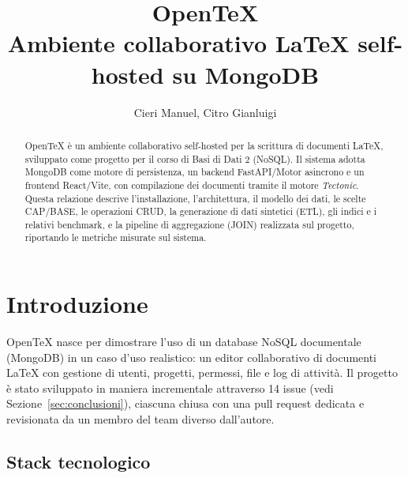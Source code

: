 \documentclass[11pt,a4paper]{article}
\title{\textbf{OpenTeX}\\[0.3em]\large Ambiente collaborativo LaTeX self-hosted su MongoDB\\[0.3em]}
\author{
  Cieri Manuel, Citro Gianluigi
}
\date{
}
\begin{document}
\maketitle
\vspace{-2.5em}
\begin{abstract}
\vspace{-0.5em}
\noindent
OpenTeX è un ambiente collaborativo self-hosted per la scrittura di documenti LaTeX, sviluppato come progetto per il corso di Basi di Dati 2 (NoSQL). Il sistema adotta MongoDB come motore di persistenza, un backend FastAPI/Motor asincrono e un frontend React/Vite, con compilazione dei documenti tramite il motore \textit{Tectonic}. Questa relazione descrive l'installazione, l'architettura, il modello dei dati, le scelte CAP/BASE, le operazioni CRUD, la generazione di dati sintetici (ETL), gli indici e i relativi benchmark, e la pipeline di aggregazione (JOIN) realizzata sul progetto, riportando le metriche misurate sul sistema.
\end{abstract}

\tableofcontents
\newpage

\section{Introduzione}

OpenTeX nasce per dimostrare l'uso di un database NoSQL documentale (MongoDB) in un caso d'uso realistico: un editor collaborativo di documenti LaTeX con gestione di utenti, progetti, permessi, file e log di attività. Il progetto è stato sviluppato in maniera incrementale attraverso 14 issue (vedi Sezione~\ref{sec:conclusioni}), ciascuna chiusa con una pull request dedicata e revisionata da un membro del team diverso dall'autore.

\subsection{Stack tecnologico}
\end{document}
